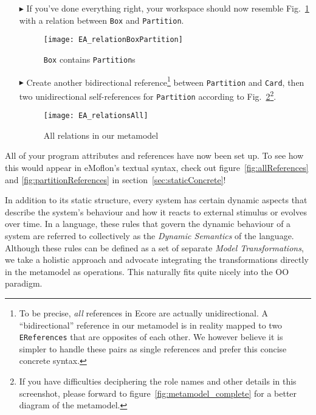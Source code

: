 \begin{enumerate}

\item[$\blacktriangleright$] If you've done everything right, your workspace should now resemble Fig.~\ref{fig:ereference_completed} with a relation between \texttt{Box} and \texttt{Partition}.

\begin{figure}[htbp]
	\centering
  \texttt{[image: EA\_relationBoxPartition]}
	\caption{\texttt{Box} contains \texttt{Partition}s}
	\label{fig:ereference_completed}
\end{figure}
\FloatBarrier


\item[$\blacktriangleright$] Create another bidirectional reference\footnote{To be precise, \emph{all} references in Ecore are actually unidirectional.
A ``bidirectional'' reference in our metamodel is in reality mapped to two \texttt{EReferences} that are opposites of each other.
We however believe it is simpler to handle these pairs as single references and prefer this concise concrete syntax.} between \texttt{Partition} and \texttt{Card}, then two unidirectional self-references for \texttt{Partition} according to Fig.~\ref{fig:ereferences_all}\footnote{If you have difficulties deciphering the role names and other details in this screenshot, please forward to figure~\ref{fig:metamodel_complete} for a better diagram of the metamodel.}.

\begin{figure}[htbp]
	\centering
  \texttt{[image: EA\_relationsAll]}
	\caption{All relations in our metamodel}
	\label{fig:ereferences_all}
\end{figure}
\end{enumerate}
\FloatBarrier

All of your program attributes and references have now been set up. To see how this would appear in eMoflon's textual syntax, check out figure~\ref{fig:allReferences} and \ref{fig:partitionReferences} in section~\ref{sec:staticConcrete}!

\vfill
\pagebreak

In addition to its static structure, every system has certain dynamic aspects that describe the system's behaviour and how it reacts to external stimulus or evolves over time.
In a language, these rules that govern the dynamic behaviour of a system are referred to collectively as the \emph{Dynamic Semantics} of the language.
Although these rules can be defined as a set of separate \emph{Model Transformations}, we take a holistic approach and advocate integrating the transformations directly in the metamodel as operations. This naturally fits quite nicely into the OO paradigm.

